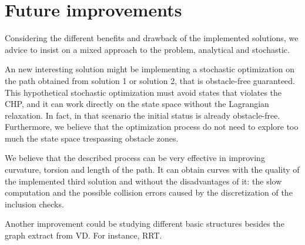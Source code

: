 \documentclass[dissertation.tex]{subfiles}
\begin{document}
\section{Future improvements}
Considering the different benefits and drawback of the implemented
solutions, we advice to insist on a mixed approach to the
problem, analytical and stochastic.

An new interesting solution might be implementing a
stochastic optimization on the path obtained from solution 1 or
solution 2, that is obstacle-free guaranteed. This hypothetical stochastic
optimization must avoid states that violates the \acf{CHP}, and it can
work directly on the state space without the Lagrangian
relaxation. In fact, in that scenario the initial status is already
obstacle-free. Furthermore, we believe that the optimization process do
not need to explore too much the state space trespassing obstacle
zones.

We believe that the described process can be very effective in
improving curvature, torsion and length of the path. It can obtain
curves with the quality of the implemented third solution and without the
disadvantages of it: the slow computation and the possible collision
errors caused by the discretization of the inclusion checks.

Another improvement could be studying different basic structures
besides the graph extract from \acf{VD}. For instance, \acf{RRT}.
\end{document}
